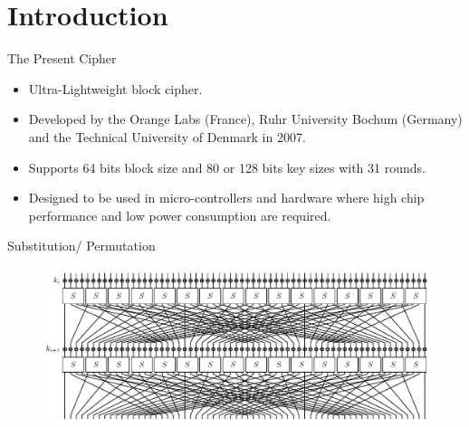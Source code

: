 \section{Introduction}


\begin{frame}{The Present Cipher}
\begin{itemize}
    \item Ultra-Lightweight block cipher.
    \item Developed by the Orange Labs (France), Ruhr University Bochum (Germany) and the Technical University of Denmark in 2007.
    \item Supports 64 bits block size and 80 or 128 bits key sizes with 31 rounds.
    \item Designed to be used in micro-controllers and hardware where high chip performance and low power consumption are required.
\end{itemize}
\end{frame}

\begin{frame}{Substitution/ Permutation}
\begin{figure}[H]
    \centering
    \includegraphics[width=\linewidth]{PRESENT_diagram.pdf}
\end{figure}
\begin{center}
    \\
\end{center}
\end{frame}
